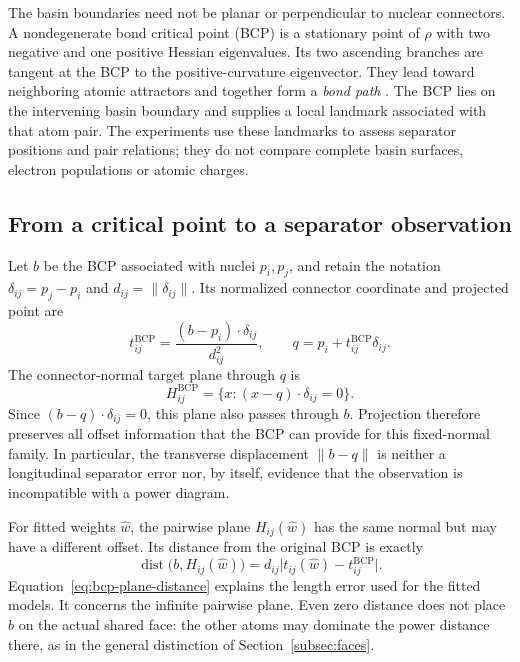 The basin boundaries need not be planar or perpendicular to nuclear connectors. A nondegenerate bond critical point (BCP) is a stationary point of $\rho$ with two negative and one positive Hessian eigenvalues. Its two ascending branches are tangent at the BCP to the positive-curvature eigenvector. They lead toward neighboring atomic attractors and together form a \emph{bond path} \citep{Bader1980,Bader1990}. The BCP lies on the intervening basin boundary and supplies a local landmark associated with that atom pair. The experiments use these landmarks to assess separator positions and pair relations; they do not compare complete basin surfaces, electron populations or atomic charges.

\subsection{From a critical point to a separator observation}
\label{app:bcp-projection}

Let $b$ be the BCP associated with nuclei $p_i,p_j$, and retain the notation $\delta_{ij}=p_j-p_i$ and $d_{ij}=\|\delta_{ij}\|$. Its normalized connector coordinate and projected point are
\begin{equation}
 t_{ij}^{\mathrm{BCP}}
 =\frac{(b-p_i)\cdot\delta_{ij}}{d_{ij}^{2}},
 \qquad
 q=p_i+t_{ij}^{\mathrm{BCP}}\delta_{ij}.
 \label{eq:bcp-projection}
\end{equation}
The connector-normal target plane through $q$ is
\[
 H_{ij}^{\mathrm{BCP}}
 =\{x:(x-q)\cdot\delta_{ij}=0\}.
\]
Since $(b-q)\cdot\delta_{ij}=0$, this plane also passes through $b$. Projection therefore preserves all offset information that the BCP can provide for this fixed-normal family. In particular, the transverse displacement $\|b-q\|$ is neither a longitudinal separator error nor, by itself, evidence that the observation is incompatible with a power diagram.

For fitted weights $\widehat w$, the pairwise plane $H_{ij}(\widehat w)$ has the same normal but may have a different offset. Its distance from the original BCP is exactly
\begin{equation}
 \operatorname{dist}\bigl(b,H_{ij}(\widehat w)\bigr)
 =d_{ij}\bigl|t_{ij}(\widehat w)-t_{ij}^{\mathrm{BCP}}\bigr|.
 \label{eq:bcp-plane-distance}
\end{equation}
Equation~\eqref{eq:bcp-plane-distance} explains the length error used for the fitted models. It concerns the infinite pairwise plane. Even zero distance does not place $b$ on the actual shared face: the other atoms may dominate the power distance there, as in the general distinction of Section~\ref{subsec:faces}.

